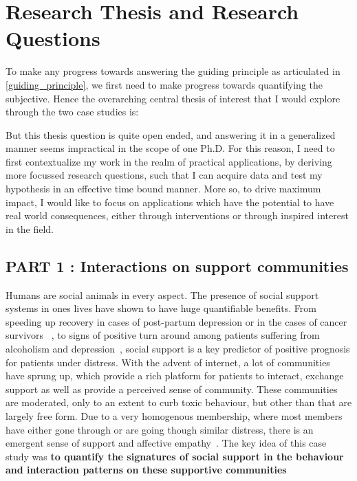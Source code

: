 \section{Research Thesis and Research Questions}
To make any progress towards answering the guiding principle as articulated in \ref{guiding_principle}, we first need to make progress towards quantifying the subjective.
Hence the overarching central thesis of interest that I would explore through the two case studies is:

\vspace{0.5cm}
\noindent{}
\vspace{0.5cm} 

But this thesis question is quite open ended, and answering it in a generalized manner seems impractical in the scope of one Ph.D. For this reason, I need to first contextualize my work in the realm  of practical applications, by deriving more focussed research questions, such that I can acquire data and test my hypothesis in an effective time bound manner. More so, to drive maximum impact, I would like to focus on applications which have the potential to have real world consequences, either through interventions or through inspired interest in the field.

\subsection{PART 1 : Interactions on support communities}
Humans are social animals in every aspect. The presence of social support systems in ones lives have shown to have huge quantifiable benefits. From speeding up recovery in cases of post-partum depression or in the cases of cancer survivors~\cite{collins1993social,dunkel1984social,baron1990social} , to signs of positive turn around among patients suffering from alcoholism and depression~\cite{peirce2000longitudinal,brown1986social}, social support is a key predictor of positive prognosis for patients under distress. With the advent of internet, a lot of communities have sprung up, which provide a rich platform for patients to interact, exchange support as well as provide a perceived sense of community. 
These communities are moderated, only to an extent to curb toxic behaviour, but other than that are largely free form. Due to a very homogenous membership, where most members have either gone through or are going though similar distress, there is an emergent sense of support and affective empathy~\cite{de2016stroke}. The key idea of this case study was \textbf{to quantify the signatures of social support in the behaviour and interaction patterns on these supportive communities} 


